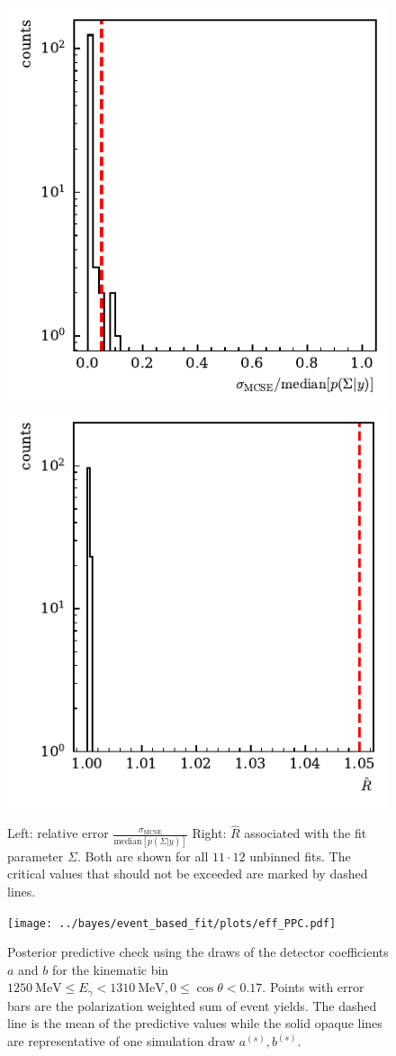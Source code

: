  \begin{figure}[htbp]
	\includegraphics[width=.49\linewidth]{../bayes/event_based_fit/plots/mcse_hist.pdf}
	\includegraphics[width=.49\linewidth]{../bayes/event_based_fit/plots/rhat_hist.pdf}
	\caption{ Left: relative error $\frac{\sigma_\text{MCSE}}{\text{median}\left[p\left(\Sigma|y\right)\right]}$ Right: $\widehat{R}$ associated with the fit parameter $\Sigma$. Both are shown for all $11\cdot12$ unbinned fits. The critical values that should not be exceeded are marked by dashed lines.}
	\label{fig:diagnostics1}
\end{figure}
\begin{figure}[htbp]
	\centering
	\texttt{[image: ../bayes/event\_based\_fit/plots/eff\_PPC.pdf]}
	\caption{Posterior predictive check using the draws of the detector coefficients $a$ and $b$ for the kinematic bin $\SI{1250}{\mega\eV}\leq E_\gamma<\SI{1310}{\mega\eV}, 0\leq\cos\theta<0.17$. Points with error bars are the polarization weighted sum of event yields. The dashed line is the mean of the predictive values while the solid opaque lines are representative of one simulation draw $a^{(s)},b^{(s)}$.}
	\label{fig:eff_func}
\end{figure}
